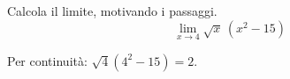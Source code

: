 
\begin{esercizio}
Calcola il limite, motivando i passaggi.
\[
        \lim_{x\to 4} \sqrt{x}\,(x^2-15)
    \]
\end{esercizio}

\begin{soluzione}
Per continuità: $\sqrt4(4^2-15)=2$.
\end{soluzione}
